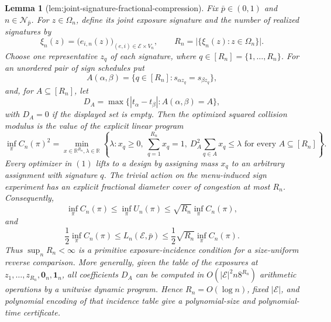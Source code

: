 \documentclass{article}
\newtheorem{lemma}{Lemma}
\begin{document}
\begin{lemma}[lem:joint-signature-fractional-compression]\label{lem:joint-signature-fractional-compression}
Fix \(\bar p\in(0,1)\) and \(n\in\mathcal N_{\bar p}\). For \(z\in\Omega_n\), define its joint exposure signature and the number of realized signatures by
\[
 \xi_n(z)=\bigl(e_{i,n}(z)\bigr)_{(e,i)\in\mathcal E\times V_n},
 \qquad
 R_n=\bigl|\{\xi_n(z):z\in\Omega_n\}\bigr|.
\]
Choose one representative \(z_q\) of each signature, where \(q\in[R_n]=\{1,\ldots,R_n\}\). For an unordered pair of sign schedules put
\[
 A(\alpha,\beta)=\{q\in[R_n]:s_{\alpha z_q}=s_{\beta z_q}\},
\]
and, for \(A\subseteq[R_n]\), let
\[
 D_A=\max\{|t_\alpha-t_\beta|:A(\alpha,\beta)=A\},
\]
with \(D_A=0\) if the displayed set is empty. Then the optimized squared collision modulus is the value of the explicit linear program
\[
 \inf_\pi C_n(\pi)^2
 =\min_{x\in\mathbb R^{R_n},\lambda\in\mathbb R}
 \left\{\lambda:
 x_q\ge0,\ \sum_{q=1}^{R_n}x_q=1,\
 D_A^2\sum_{q\in A}x_q\le\lambda
 \text{ for every }A\subseteq[R_n]\right\}. \tag{1}
\]
Every optimizer in \((1)\) lifts to a design by assigning mass \(x_q\) to an arbitrary assignment with signature \(q\). The trivial action on the menu-induced sign experiment has an explicit fractional diameter cover of congestion at most \(R_n\). Consequently,
\[
 \inf_\pi C_n(\pi)
 \le \inf_\pi U_n(\pi)
 \le \sqrt{R_n}\inf_\pi C_n(\pi), \tag{2}
\]
and
\[
 \frac12\inf_\pi C_n(\pi)
 \le L_n(\mathcal E,\bar p)
 \le\frac12\sqrt{R_n}\inf_\pi C_n(\pi). \tag{3}
\]
Thus \(\sup_nR_n<\infty\) is a primitive exposure-incidence condition for a size-uniform reverse comparison. More generally, given the table of the exposures at \(z_1,\ldots,z_{R_n},\mathbf 0_n,\mathbf 1_n\), all coefficients \(D_A\) can be computed in \(O(|\mathcal E|^2n8^{R_n})\) arithmetic operations by a unitwise dynamic program. Hence \(R_n=O(\log n)\), fixed \(|\mathcal E|\), and polynomial encoding of that incidence table give a polynomial-size and polynomial-time certificate.
\end{lemma}
\end{document}
